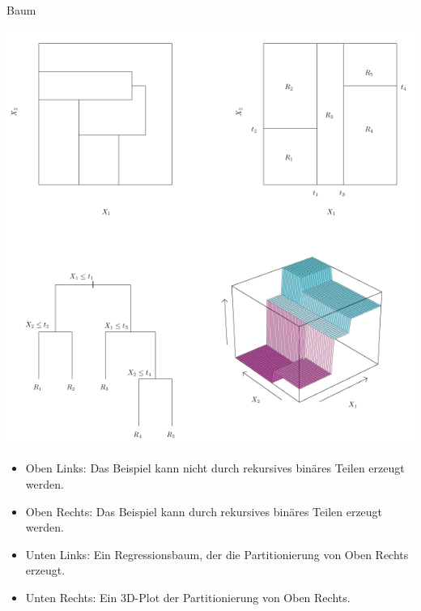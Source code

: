 \begin{example}{Baum}
    \begin{center}
        \includegraphics[width=.55\textwidth]{includes/figures/example_baeume.png}
    \end{center}

    \begin{itemize}
        \item Oben Links: Das Beispiel kann nicht durch rekursives binäres Teilen erzeugt werden.
        \item Oben Rechts: Das Beispiel kann durch rekursives binäres Teilen erzeugt werden.
        \item Unten Links: Ein Regressionsbaum, der die Partitionierung von Oben Rechts erzeugt.
        \item Unten Rechts: Ein 3D-Plot der Partitionierung von Oben Rechts.
    \end{itemize}
\end{example}

